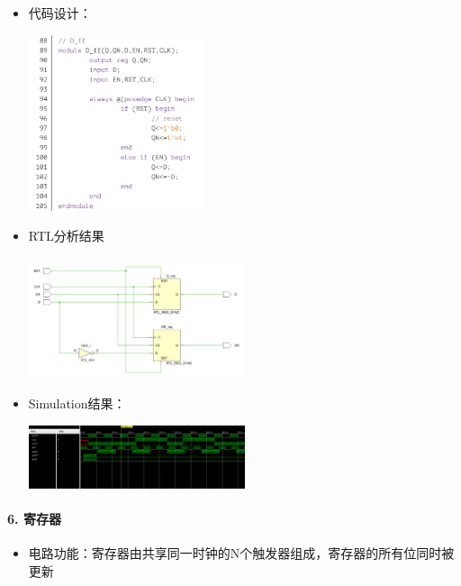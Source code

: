 \documentclass[a4,10pt,zihao=-4]{ctexart}
\begin{document}
\begin{itemize}
\item
  代码设计：
  
  \includegraphics[width=0.4\textwidth]{DFF_Code.png}
\item
  RTL分析结果
  
  \includegraphics[width=0.5\textwidth]{DFF_RTL.png}
\item
  Simulation结果：
  
  \includegraphics[width=0.5\textwidth]{DFF_Simulation.png}
\end{itemize}

\paragraph{6. 寄存器}

\begin{itemize}
\item
  电路功能：寄存器由共享同一时钟的N个触发器组成，寄存器的所有位同时被更新
\end{itemize}
\end{document}
